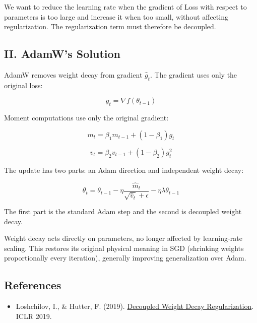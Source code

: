 We want to reduce the learning rate when the gradient of Loss with respect to parameters is too large and increase it when too small, without affecting regularization. The regularization term must therefore be decoupled.

\hypertarget{ii.-adamws-solution}{%
\subsection{II. AdamW's Solution}\label{ii.-adamws-solution}}

AdamW removes weight decay from gradient \(\hat{g}_t\). The gradient uses only the original loss:

\[
g_t = \nabla f(\theta_{t-1})
\]

Moment computations use only the original gradient:

\[
m_t = \beta_1m_{t-1} + (1-\beta_1)g_t
\]

\[
v_t = \beta_2v_{t-1} + (1-\beta_2)g_t^2
\]

The update has two parts: an Adam direction and independent weight decay:

\[
\theta_t = \theta_{t-1} - \eta\frac{\hat{m}_t}{\sqrt{\hat{v}_t}+\epsilon} - \eta\lambda\theta_{t-1}
\]

The first part is the standard Adam step and the second is decoupled weight decay.

Weight decay acts directly on parameters, no longer affected by learning-rate scaling. This restores its original physical meaning in SGD (shrinking weights proportionally every iteration), generally improving generalization over Adam.

\FloatBarrier
{}
\hypertarget{references-29}{%
\subsection{References}\label{references-29}}

\vspace{0.25em}
\begin{itemize}
\tightlist
\item
  Loshchilov, I., \& Hutter, F. (2019). \href{https://arxiv.org/abs/1711.05101}{Decoupled Weight Decay Regularization}. ICLR 2019.
\end{itemize}

\clearpage
